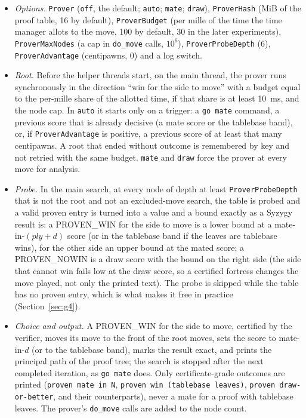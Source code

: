 \documentclass{article}
\theoremstyle{plain}
\theoremstyle{definition}
\theoremstyle{remark}
\newcommand{\PW}{\textsf{PROVEN\_WIN}}
\newcommand{\PN}{\textsf{PROVEN\_NOWIN}}
\newcommand{\code}[1]{\texttt{#1}}
\begin{document}
\begin{itemize}[leftmargin=*]
\item \emph{Options.} \code{Prover} (\code{off}, the default; \code{auto}; \code{mate}; \code{draw}), \code{ProverHash} (MiB of the proof table, 16 by default), \code{ProverBudget} (per mille of the time the time manager allots to the move, 100 by default, 30 in the later experiments), \code{ProverMaxNodes} (a cap in \code{do\_move} calls, $10^6$), \code{ProverProbeDepth} (6), \code{ProverAdvantage} (centipawns, 0) and a log switch.
\item \emph{Root.} Before the helper threads start, on the main thread, the prover runs synchronously in the direction ``win for the side to move'' with a budget equal to the per-mille share of the allotted time, if that share is at least 10~ms, and the node cap. In \code{auto} it starts only on a trigger: a \code{go mate} command, a previous score that is already decisive (a mate score or the tablebase band), or, if \code{ProverAdvantage} is positive, a previous score of at least that many centipawns. A root that ended without outcome is remembered by key and not retried with the same budget. \code{mate} and \code{draw} force the prover at every move for analysis.
\item \emph{Probe.} In the main search, at every node of depth at least \code{ProverProbeDepth} that is not the root and not an excluded-move search, the table is probed and a valid proven entry is turned into a value and a bound exactly as a Syzygy result is: a \PW{} for the side to move is a lower bound at a mate-in-$(\mathit{ply} + d)$ score (or in the tablebase band if the leaves are tablebase wins), for the other side an upper bound at the mated score; a \PN{} is a draw score with the bound on the right side (the side that cannot win fails low at the draw score, so a certified fortress changes the move played, not only the printed text). The probe is skipped while the table has no proven entry, which is what makes it free in practice (Section~\ref{sec:g4}).
\item \emph{Choice and output.} A \PW{} for the side to move, certified by the verifier, moves its move to the front of the root moves, sets the score to mate-in-$d$ (or to the tablebase band), marks the result exact, and prints the principal path of the proof tree; the search is stopped after the next completed iteration, as \code{go mate} does. Only certificate-grade outcomes are printed (\code{proven mate in N}, \code{proven win (tablebase leaves)}, \code{proven draw-or-better}, and their counterparts), never a mate for a proof with tablebase leaves. The prover's \code{do\_move} calls are added to the node count.
\end{itemize}
\end{document}
